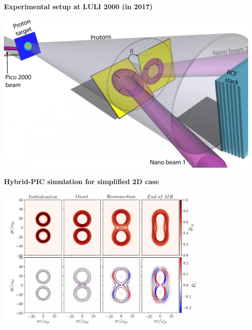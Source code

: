 \documentclass[landscape]{slides}
\begin{document}
\begin{slide}
\large{\textbf{Experimental setup at LULI 2000 (in 2017)}}

\begin{center}
\includegraphics[width=1.0\textwidth]{manip.png}
\end{center}

\end{slide}

\begin{slide}
\large{\textbf{Hybrid-PIC simulation for simplified 2D case}}

\begin{center}
\includegraphics[width=0.8\textwidth]{simu2D.png}
\end{center}

\end{slide}
\end{document}
